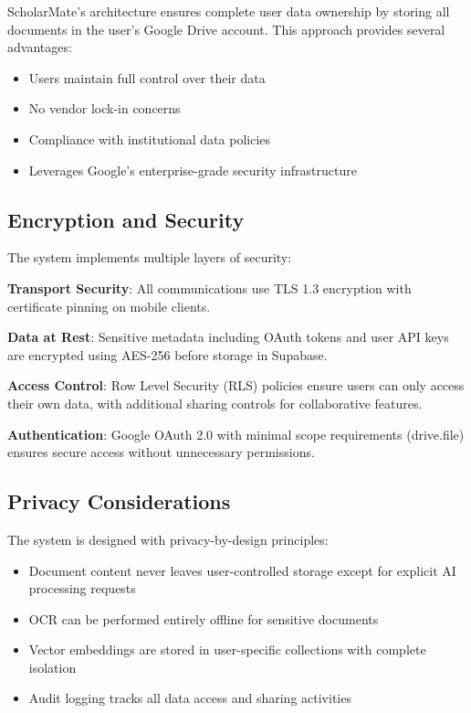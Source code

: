 \documentclass[conference]{IEEEtran}
\begin{document}
ScholarMate's architecture ensures complete user data ownership by storing all documents in the user's Google Drive account. This approach provides several advantages:

\begin{itemize}
\item Users maintain full control over their data
\item No vendor lock-in concerns
\item Compliance with institutional data policies
\item Leverages Google's enterprise-grade security infrastructure
\end{itemize}

\subsection{Encryption and Security}

The system implements multiple layers of security:

\textbf{Transport Security}: All communications use TLS 1.3 encryption with certificate pinning on mobile clients.

\textbf{Data at Rest}: Sensitive metadata including OAuth tokens and user API keys are encrypted using AES-256 before storage in Supabase.

\textbf{Access Control}: Row Level Security (RLS) policies ensure users can only access their own data, with additional sharing controls for collaborative features.

\textbf{Authentication}: Google OAuth 2.0 with minimal scope requirements (drive.file) ensures secure access without unnecessary permissions.

\subsection{Privacy Considerations}

The system is designed with privacy-by-design principles:

\begin{itemize}
\item Document content never leaves user-controlled storage except for explicit AI processing requests
\item OCR can be performed entirely offline for sensitive documents
\item Vector embeddings are stored in user-specific collections with complete isolation
\item Audit logging tracks all data access and sharing activities
\end{itemize}
\end{document}
